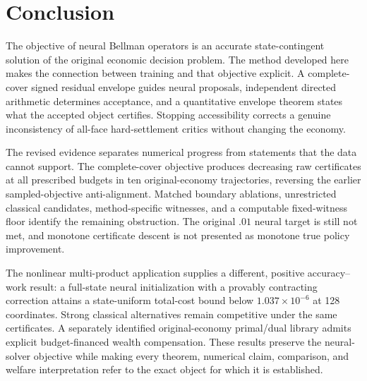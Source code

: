 \section{Conclusion}\label{sec:conclusion}
The objective of neural Bellman operators is an accurate state-contingent solution of the original economic decision problem. The method developed here makes the connection between training and that objective explicit. A complete-cover signed residual envelope guides neural proposals, independent directed arithmetic determines acceptance, and a quantitative envelope theorem states what the accepted object certifies. Stopping accessibility corrects a genuine inconsistency of all-face hard-settlement critics without changing the economy.

The revised evidence separates numerical progress from statements that the data cannot support. The complete-cover objective produces decreasing raw certificates at all prescribed budgets in ten original-economy trajectories, reversing the earlier sampled-objective anti-alignment. Matched boundary ablations, unrestricted classical candidates, method-specific witnesses, and a computable fixed-witness floor identify the remaining obstruction. The original $.01$ neural target is still not met, and monotone certificate descent is not presented as monotone true policy improvement.

The nonlinear multi-product application supplies a different, positive accuracy--work result: a full-state neural initialization with a provably contracting correction attains a state-uniform total-cost bound below $1.037\times10^{-6}$ at 128 coordinates. Strong classical alternatives remain competitive under the same certificates. A separately identified original-economy primal/dual library admits explicit budget-financed wealth compensation. These results preserve the neural-solver objective while making every theorem, numerical claim, comparison, and welfare interpretation refer to the exact object for which it is established.
